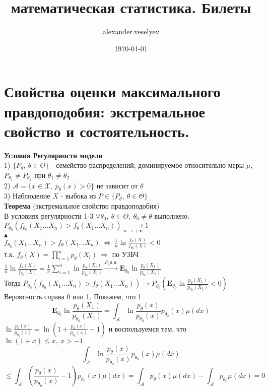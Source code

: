 \documentclass[25pt]{article}
\title{математическая статистика. Билеты}
\author{alexander.veselyev }
\date{\today}
\begin{document}
\section{Свойства оценки максимального правдоподобия: экстремальное свойство и состоятельность.}

\textbf{Условия Регулярности модели}\\
1) $\{P_\theta,\ \theta\in\Theta\}$ - семейство распределений, доминируемое относительно
меры $\mu$, $P_{\theta_1} \neq P_{\theta_2}$ при $\theta_1 \neq \theta_2$\\
2) $\mathcal{A} = \{x\in\mathcal{X},\ p_\theta(x)>0\}$ не зависит от $\theta$\\
3) Наблюдение $X$ - выбока из $P \in \{P_\theta,\ \theta\in\Theta\}$\\
\textbf{Теорема} (экстремальное свойство правдоподобия)\\
В условиях регулярности 1-3 $\forall \theta_0,\ \theta\in\Theta,\ \theta_0\neq\theta$ выполнено:\\
$P_{\theta_0}(f_{\theta_0}(X_1\dots X_n)>f_\theta(X_1\dots X_n)) \xrightarrow[n\rightarrow+\infty]{} 1$\\
$\blacktriangle$
\\
$f_{\theta_0}(X_1\dots X_n)>f_\theta(X_1\dots X_n)\ \Leftrightarrow\ \frac{1}{n}\ln\frac{f_\theta(X)}{f_{\theta_0}(X)}<0$\\
т.к. $f_\theta(X) = \prod_{i=1}^n p_\theta(X_i)\ \Rightarrow$ по УЗБЧ\\
$\frac{1}{n}\ln\frac{f_\theta(X)}{f_{\theta_0}(X)}=\frac{1}{n}\sum_{i=1}^n{\ln\frac{p_\theta(X_i)}{p_{\theta_0}(X_i)}}\xrightarrow{P_\theta\text{п.н.}}\textbf{E}_{\theta_0}\ln\frac{p_\theta(X_1)}{p_{\theta_0}(X_1)}$\\
Тогда $P_{\theta_0}(f_{\theta_0}(X_1\dots X_n)>f_\theta(X_1\dots X_n))\rightarrow P_{\theta_0}(\textbf{E}_{\theta_0}\ln\frac{p_\theta(X_1)}{p_{\theta_0}(X_1)} < 0)$\\
Вероятность справа 0 или 1. Покажем, что 1\\
$$\textbf{E}_{\theta_0}\ln\frac{p_\theta(X_1)}{p_{\theta_0}(X_1)} = \int_{\mathcal{A}}\ln\frac{p_\theta(x)}{p_{\theta_0}(x)}p_{\theta_0}(x)\mu(d x)$$
$\ln\frac{p_\theta(x)}{p_{\theta_0}(x)} = \ln(1 + \frac{p_\theta(x)}{p_{\theta_0}(x)} - 1)$ и воспользуемся
тем, что\\ $\ln(1+x)\leq x,\ x>-1$
$$\int_{\mathcal{A}}\ln\frac{p_\theta(x)}{p_{\theta_0}(x)}p_{\theta_0}(x)\mu(d x) $$
$$\leq \int_{\mathcal{A}}\left(\frac{p_\theta(x)}{p_{\theta_0}(x)} - 1\right)p_{\theta_0}(x)\mu(d x) = \int_\mathcal{A}{p_\theta(x)\mu(d x)} -\int_\mathcal{A}{p_{\theta_0}\mu(d x)} = 0$$
\end{document}
